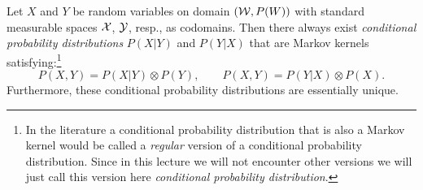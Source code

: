 \begin{Cor}
    \label{cor:reg-cond-prob-distr}
    Let $X$ and $Y$ be random variables on domain $(\mathcal{W},P(W))$ with standard measurable spaces $\mathcal{X}$, $\mathcal{Y}$, resp., as codomains.
    Then there always exist \emph{conditional probability distributions} $P(X|Y)$ and $P(Y|X)$ that are Markov kernels satisfying:\footnote{In the literature a conditional probability distribution that is also a Markov kernel would be called a \emph{regular} version of a conditional probability distribution. Since in this lecture we will not encounter other versions we will just call this version here \emph{conditional probability distribution}.}
    \[ P(X,Y) = P(X|Y) \otimes P(Y),\qquad P(X,Y) = P(Y|X) \otimes P(X).  \]
    Furthermore, these conditional probability distributions are essentially unique.
\end{Cor}


